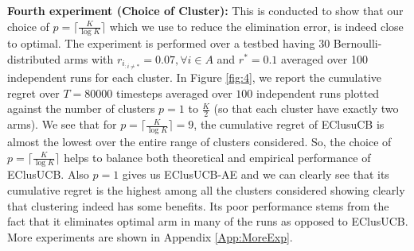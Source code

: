 \textbf{Fourth experiment (Choice of Cluster):} This is conducted to show that our choice of $p=\lceil\frac{K}{\log K}\rceil$ which we use to reduce the elimination error, is indeed close to optimal. The experiment is performed over a testbed having $30$ Bernoulli-distributed arms with $r_{i_{:{{i}\neq {*}}}}=0.07,\forall i\in A$ and $r^{*}=0.1$ averaged over 100 independent runs for each cluster. In Figure \ref{fig:4}, we report the cumulative regret over $T=80000$ timesteps averaged over $100$ independent runs plotted against the number of clusters $p=1$ to $\frac{K}{2}$ (so that each cluster have exactly two arms). We see that for $p=\lceil\frac{K}{\log K}\rceil=9$, the cumulative regret of EClusuCB is almost the lowest over the entire range of clusters considered. So, the choice of $p=\lceil\frac{K}{\log K}\rceil$ helps to balance both theoretical and empirical performance of EClusUCB. Also $p=1$ gives us EClusUCB-AE and we can clearly see that its cumulative regret is the highest among all the clusters considered showing clearly that clustering indeed has some benefits. Its poor performance stems from the fact that it eliminates optimal arm in many of the runs as opposed to EClusUCB. More experiments are shown in Appendix \ref{App:MoreExp}.



